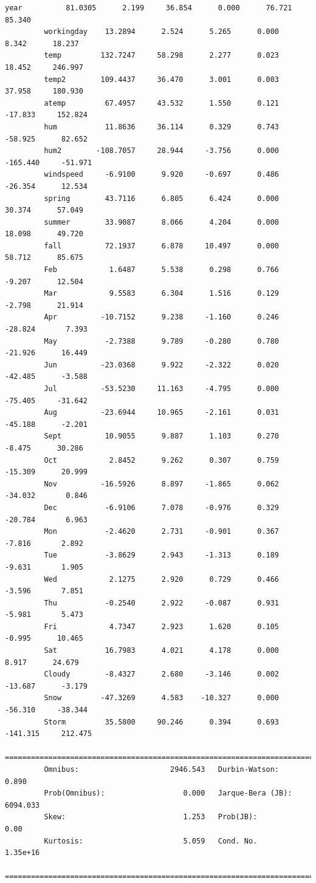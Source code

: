 \documentclass[11pt]{article}
\begin{document}
\begin{Verbatim}[commandchars=\\\{\}]
         year          81.0305      2.199     36.854      0.000      76.721      85.340
         workingday    13.2894      2.524      5.265      0.000       8.342      18.237
         temp         132.7247     58.298      2.277      0.023      18.452     246.997
         temp2        109.4437     36.470      3.001      0.003      37.958     180.930
         atemp         67.4957     43.532      1.550      0.121     -17.833     152.824
         hum           11.8636     36.114      0.329      0.743     -58.925      82.652
         hum2        -108.7057     28.944     -3.756      0.000    -165.440     -51.971
         windspeed     -6.9100      9.920     -0.697      0.486     -26.354      12.534
         spring        43.7116      6.805      6.424      0.000      30.374      57.049
         summer        33.9087      8.066      4.204      0.000      18.098      49.720
         fall          72.1937      6.878     10.497      0.000      58.712      85.675
         Feb            1.6487      5.538      0.298      0.766      -9.207      12.504
         Mar            9.5583      6.304      1.516      0.129      -2.798      21.914
         Apr          -10.7152      9.238     -1.160      0.246     -28.824       7.393
         May           -2.7388      9.789     -0.280      0.780     -21.926      16.449
         Jun          -23.0368      9.922     -2.322      0.020     -42.485      -3.588
         Jul          -53.5230     11.163     -4.795      0.000     -75.405     -31.642
         Aug          -23.6944     10.965     -2.161      0.031     -45.188      -2.201
         Sept          10.9055      9.887      1.103      0.270      -8.475      30.286
         Oct            2.8452      9.262      0.307      0.759     -15.309      20.999
         Nov          -16.5926      8.897     -1.865      0.062     -34.032       0.846
         Dec           -6.9106      7.078     -0.976      0.329     -20.784       6.963
         Mon           -2.4620      2.731     -0.901      0.367      -7.816       2.892
         Tue           -3.8629      2.943     -1.313      0.189      -9.631       1.905
         Wed            2.1275      2.920      0.729      0.466      -3.596       7.851
         Thu           -0.2540      2.922     -0.087      0.931      -5.981       5.473
         Fri            4.7347      2.923      1.620      0.105      -0.995      10.465
         Sat           16.7983      4.021      4.178      0.000       8.917      24.679
         Cloudy        -8.4327      2.680     -3.146      0.002     -13.687      -3.179
         Snow         -47.3269      4.583    -10.327      0.000     -56.310     -38.344
         Storm         35.5800     90.246      0.394      0.693    -141.315     212.475
         ==============================================================================
         Omnibus:                     2946.543   Durbin-Watson:                   0.890
         Prob(Omnibus):                  0.000   Jarque-Bera (JB):             6094.033
         Skew:                           1.253   Prob(JB):                         0.00
         Kurtosis:                       5.059   Cond. No.                     1.35e+16
         ==============================================================================
         

\end{Verbatim}
\end{document}
